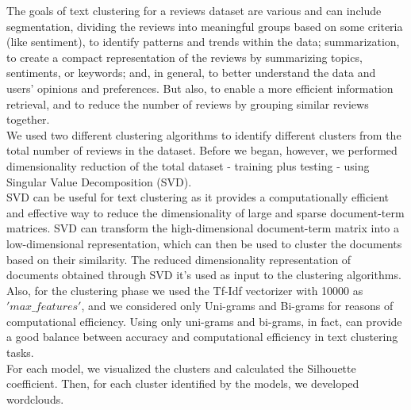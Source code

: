 \documentclass[fleqn,10pt]{SelfArx} %
\begin{document}
The goals of text clustering for a reviews dataset are various and can include segmentation, dividing the reviews into meaningful groups based on some criteria (like sentiment), to identify patterns and trends within the data; summarization, to create a compact representation of the reviews by summarizing topics, sentiments, or keywords; and, in general, to better understand the data and users' opinions and preferences. But also, to enable a more efficient information retrieval, and to reduce the number of reviews by grouping similar reviews together.\\
We used two different clustering algorithms to identify different clusters from the total number of reviews in the dataset. Before we began, however, we performed dimensionality reduction of the total dataset - training plus testing - using Singular Value Decomposition (SVD).\\
SVD can be useful for text clustering as it provides a computationally efficient and effective way to reduce the dimensionality of large and sparse document-term matrices. SVD can transform the high-dimensional document-term matrix into a low-dimensional representation, which can then be used to cluster the documents based on their similarity. The reduced dimensionality representation of documents obtained through SVD it's used as input to the clustering algorithms.\\
Also, for the clustering phase we used the Tf-Idf vectorizer with 10000 as $'max\_features'$, and we considered only Uni-grams and Bi-grams for reasons of computational efficiency. Using only uni-grams and bi-grams, in fact, can provide a good balance between accuracy and computational efficiency in text clustering tasks.\\
For each model, we visualized the clusters and calculated the Silhouette coefficient. Then, for each cluster identified by the models, we developed wordclouds.
\end{document}
